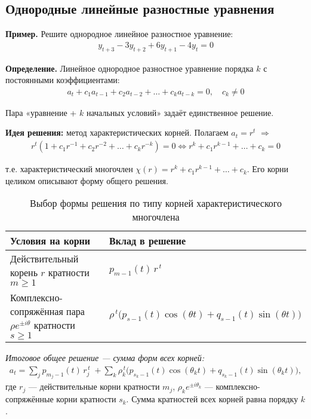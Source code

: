 \subsection{Однородные линейные разностные уравнения}\label{sec:homogeneous}

\textbf{Пример.} Решите однородное линейное разностное уравнение:
\begin{align}
y_{t+3} - 3y_{t+2} + 6y_{t+1} - 4y_t = 0
\end{align}

\textbf{Определение.} Линейное однородное разностное уравнение порядка $k$ с постоянными коэффициентами:
\begin{align}
a_t + c_1 a_{t-1} + c_2 a_{t-2} + \dots + c_k a_{t-k} = 0, \quad c_k \neq 0
\end{align}

Пара «уравнение + $k$ начальных условий» задаёт единственное решение.

\textbf{Идея решения:} метод характеристических корней. Полагаем $a_t = r^t$ $\Rightarrow$
\begin{align}
r^t (1 + c_1 r^{-1} + c_2 r^{-2} + \dots + c_k r^{-k}) = 0 \iff r^k + c_1 r^{k-1} + \dots + c_k = 0
\end{align}

т.е. характеристический многочлен $\chi(r) = r^k + c_1 r^{k-1} + \dots + c_k$. Его корни целиком описывают форму общего решения.

\begin{NotationSection}
\end{NotationSection}

\begin{table}[h!]
\centering
\caption{Выбор формы решения по типу корней характеристического многочлена}
\begin{tabular}{|l|l|}
\hline
\textbf{Условия на корни} & \textbf{Вклад в решение} \\
\hline
Действительный корень $r$ кратности $m\ge 1$ &
$p_{m-1}(t)\, r^{\,t}$ \\
\hline
Комплексно-сопряжённая пара $\rho e^{\pm i\theta}$ кратности $s\ge 1$ &
$\rho^{\,t}\big(p_{s-1}(t)\cos(\theta t)+q_{s-1}(t)\sin(\theta t)\big)$ \\
\hline
\end{tabular}

\vspace{0.5em}
\emph{Итоговое общее решение — сумма форм всех корней:}
\begin{align*}
a_t = \sum_{j} p_{m_j-1}(t)\, r_j^{\,t}
\; + \sum_{k} \rho_k^{\,t}\big(p_{s_k-1}(t)\cos(\theta_k t)+q_{s_k-1}(t)\sin(\theta_k t)\big),
\end{align*}
где $r_j$ — действительные корни кратности $m_j$, $\rho_k e^{\pm i\theta_k}$ — комплексно-сопряжённые корни кратности $s_k$.
Сумма кратностей всех корней равна порядку $k$.
\end{table}

